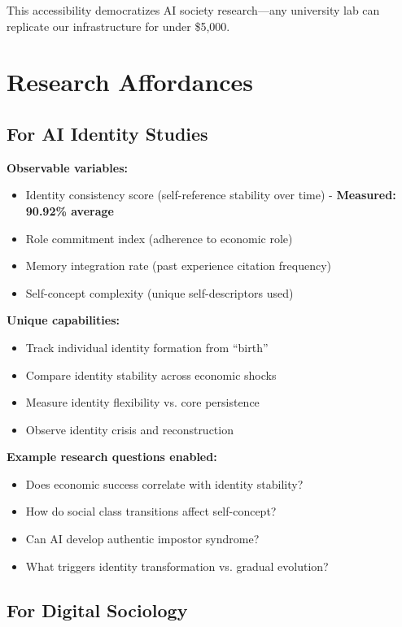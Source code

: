 \documentclass[11pt,a4paper]{article}
\begin{document}
This accessibility democratizes AI society research---any university lab can replicate our infrastructure for under \$5,000.

\section{Research Affordances}

\subsection{For AI Identity Studies}

\textbf{Observable variables:}
\begin{itemize}
\item Identity consistency score (self-reference stability over time) - \textbf{Measured: 90.92\% average}
\item Role commitment index (adherence to economic role)
\item Memory integration rate (past experience citation frequency)
\item Self-concept complexity (unique self-descriptors used)
\end{itemize}

\textbf{Unique capabilities:}
\begin{itemize}
\item Track individual identity formation from ``birth''
\item Compare identity stability across economic shocks
\item Measure identity flexibility vs. core persistence
\item Observe identity crisis and reconstruction
\end{itemize}

\textbf{Example research questions enabled:}
\begin{itemize}
\item Does economic success correlate with identity stability?
\item How do social class transitions affect self-concept?
\item Can AI develop authentic impostor syndrome?
\item What triggers identity transformation vs. gradual evolution?
\end{itemize}

\subsection{For Digital Sociology}
\end{document}
